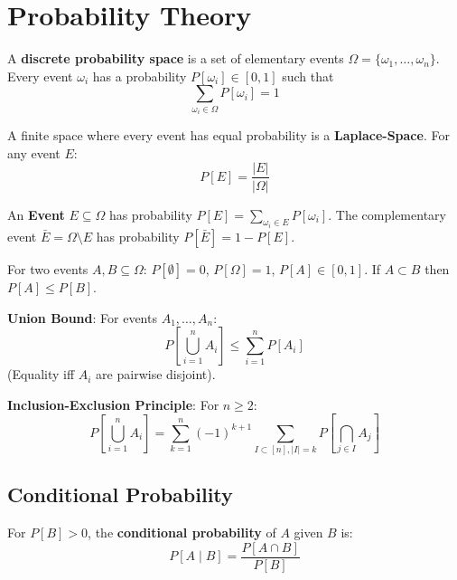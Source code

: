 \section{Probability Theory}

\begin{definition}
A \textbf{discrete probability space} is a set of elementary events $\Omega = \{\omega_1, \dots, \omega_n \}$.
Every event $\omega_i$ has a probability $P[\omega_i] \in [0,1]$ such that
$$\sum_{\omega_i \in \Omega} P[\omega_i] = 1$$
\end{definition}

\begin{remark}
A finite space where every event has equal probability is a \textbf{Laplace-Space}. For any event $E$:
$$P[E] = \frac{\vert E \vert}{\vert \Omega \vert}$$
\end{remark}

\begin{definition}
An \textbf{Event} $E \subseteq \Omega$ has probability $P[E] = \sum_{\omega_i \in E} P[\omega_i]$.
The complementary event $\bar{E} = \Omega \setminus E$ has probability $P[\bar{E}] = 1 - P[E]$.
\end{definition}

\begin{theorem}
For two events $A, B \subseteq \Omega$:
$P[\emptyset] = 0$, $P[\Omega] = 1$, $P[A] \in [0,1]$.
If $A \subset B$ then $P[A] \le P[B]$.
\end{theorem}

\begin{theorem}
\textbf{Union Bound}: For events $A_1, \dots, A_n$:
$$P[\bigcup_{i=1}^n A_i] \leq \sum_{i=1}^n P[A_i]$$
(Equality iff $A_i$ are pairwise disjoint).
\end{theorem}

\begin{theorem}
\textbf{Inclusion-Exclusion Principle}: For $n \geq 2$:
$$P[\bigcup_{i=1}^n A_i] = \sum_{k=1}^n (-1)^{k+1} \sum_{I \subset [n], |I|=k} P[\bigcap_{j \in I} A_j]$$
\end{theorem}

\subsection{Conditional Probability}

\begin{definition}
For $P[B] > 0$, the \textbf{conditional probability} of $A$ given $B$ is:
$$P[A \mid B] = \frac{P[A \cap B]}{P[B]}$$
\end{definition}

